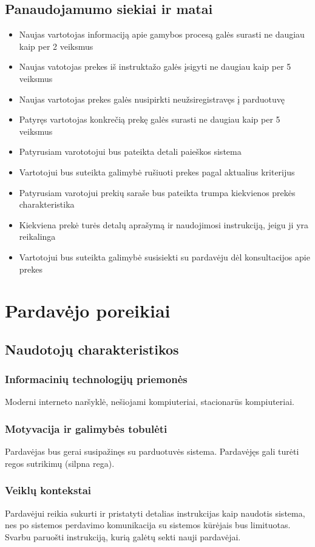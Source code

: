 \documentclass[oneside]{VUMIFPSkursinis}
\begin{document}
	\subsection{Panaudojamumo siekiai ir matai}
		\begin{itemize}
			\item{Naujas vartotojas informaciją apie gamybos procesą galės surasti ne daugiau kaip per 2 veiksmus}
			\item{Naujas vatotojas prekes iš instruktažo galės įsigyti ne daugiau kaip per 5 veiksmus}
			\item{Naujas vartotojas prekes galės nusipirkti neužsiregistravęs į parduotuvę}
			\item{Patyręs vartotojas konkrečią prekę galės surasti ne daugiau kaip per 5 veiksmus}
			\item{Patyrusiam varototojui bus pateikta detali paieškos sistema}
			\item{Vartotojui bus suteikta galimybė rušiuoti prekes pagal aktualius kriterijus}
			\item{Patyrusiam varotojui prekių saraše bus pateikta trumpa kiekvienos prekės charakteristika}
			\item{Kiekviena prekė turės detalų aprašymą ir naudojimosi instrukciją, jeigu ji yra reikalinga}
			\item{Vartotojui bus suteikta galimybė susisiekti su pardavėju dėl konsultacijos apie prekes}
		\end{itemize}

\section{Pardavėjo poreikiai}
	\subsection{Naudotojų charakteristikos}
		\subsubsection{Informacinių technologijų priemonės}
			Moderni interneto naršyklė, nešiojami kompiuteriai, stacionarūs kompiuteriai.
		\subsubsection{Motyvacija ir galimybės tobulėti}
			Pardavėjas bus gerai susipažinęs su parduotuvės sistema. Pardavėjęs gali turėti regos sutrikimų (silpna rega).
		\subsubsection{Veiklų kontekstai}
			Pardavėjui reikia sukurti ir pristatyti detalias instrukcijas kaip naudotis sistema, nes po sistemos perdavimo komunikacija su sistemos kūrėjais bus limituotas. Svarbu paruošti instrukciją, kurią galėtų sekti nauji pardavėjai.
\end{document}
